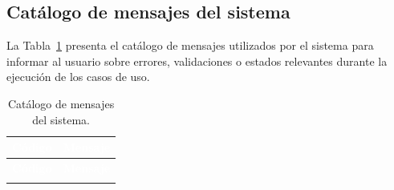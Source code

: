 \newpage
\subsection{Catálogo de mensajes del sistema}
La Tabla~\ref{tab:catalogoMensajes} presenta el catálogo de mensajes utilizados por el sistema para informar al usuario sobre errores, validaciones o estados relevantes durante la ejecución de los casos de uso.

\begin{longtable}{|p{2.5cm}|p{10.5cm}|}
\caption{Catálogo de mensajes del sistema.}
\label{tab:catalogoMensajes} \\
\hline
\rowcolor{black}
\textcolor{white}{\textbf{Código}} & \textcolor{white}{\textbf{Mensaje}} \\ \hline
\endfirsthead
\hline
\rowcolor{black}
\textcolor{white}{\textbf{Código}} & \textcolor{white}{\textbf{Mensaje}} \\ \hline
\endhead
\hline
\endfoot
\hline
\endlastfoot


\end{longtable}
